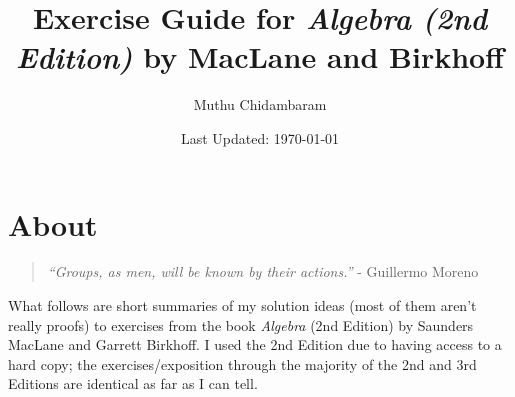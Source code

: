 \documentclass{article}
\begin{document}
\title{Exercise Guide for \textit{Algebra (2nd Edition)} by MacLane and Birkhoff}
\author{Muthu Chidambaram}
\date{Last Updated: \today}

\maketitle

\tableofcontents
\newpage 

\section*{About}

\begin{quote}
        \textit{``Groups, as men, will be known by their actions.''} - Guillermo Moreno
\end{quote}

What follows are short summaries of my solution ideas (most of them aren't really proofs) to exercises
from the book \textit{Algebra} (2nd Edition) by Saunders MacLane and Garrett Birkhoff.
I used the 2nd Edition due to having access to a hard copy; the exercises/exposition through the majority
of the 2nd and 3rd Editions are identical as far as I can tell.



\end{document}
